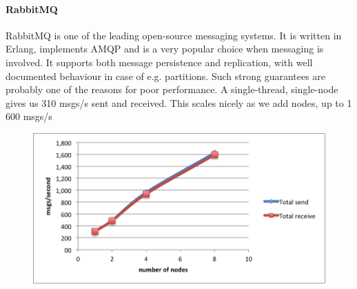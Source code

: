 \paragraph{RabbitMQ}
\label{sec:sec01}
RabbitMQ is one of the leading open-source messaging systems. 
It is written in Erlang, implements AMQP and is a very popular choice when messaging is involved. 
It supports both message persistence and replication, with well documented behaviour in case of e.g. partitions.
Such strong guarantees are probably one of the reasons for poor performance. 
A single-thread, single-node gives us 310 msgs/s sent and received. 
This scales nicely as we add nodes, up to 1 600 msgs/s
 \begin{figure}[h!]
	\centering
	\includegraphics[height=0.3\textheight]{fig01/RabbitMQ}
	\label{fig:FilialesEtClients}
\end{figure}


